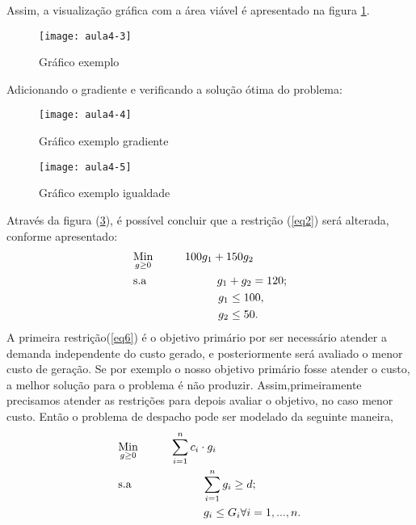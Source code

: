 Assim, a visualização gráfica com a área viável é apresentado na figura \ref{fig:aula4-3}.
\begin{figure}[H]
\begin{centering}
\texttt{[image: aula4-3]}\protect\caption{\label{fig:aula4-3} Gráfico exemplo }
\end{centering}
\end{figure}
Adicionando o gradiente e verificando a solução ótima do problema:

\begin{figure}[H]
\begin{centering}
\texttt{[image: aula4-4]}\protect\caption{\label{fig:aula4-4} Gráfico exemplo gradiente }
\end{centering}
\end{figure}

\begin{figure}[H]
\begin{centering}
\texttt{[image: aula4-5]}\protect\caption{\label{fig:aula4-5} Gráfico exemplo igualdade}
\end{centering}
\end{figure}

Através da figura (\ref{fig:aula4-5}), é possível concluir que a restrição (\ref{eq2}) será alterada, conforme apresentado:
\begin{align}
    & \underset{g\geq0}{\text{Min}} \hspace{1cm} 100g_1+150g_2 \label{eq5} \\
    & \text{s.a}  \hspace{2.2cm} g_1+g_2 = 120; \label{eq6} \\
    &             \hspace{2.65cm} g_1\leq 100, \label{eq7}\\
    &             \hspace{2.65cm} g_2\leq 50. \label{eq8}
\end{align}
A primeira restrição(\ref{eq6}) é o objetivo primário por ser necessário atender a demanda independente do custo gerado, e posteriormente será avaliado o menor custo de geração. Se por exemplo o nosso objetivo primário fosse atender o custo, a melhor solução para o problema é não produzir. Assim,primeiramente precisamos  atender as restrições para depois avaliar o objetivo, no caso menor custo.
Então o problema de despacho pode ser modelado da seguinte maneira,
\begin{align}
    & \underset{g\geq0}{\text{Min}} \hspace{1cm} \sum_{i=1}^{n}c_{i}\cdot g_{i} \label{eq9} \\
    & \text{s.a}  \hspace{2.2cm} \sum_{i=1}^{n}g_{i}\geq d; \label{eq10} \\
    &             \hspace{2.65cm}g_{i}\leq G_{i} \forall i=1,...,n. \label{eq11}
\end{align}

